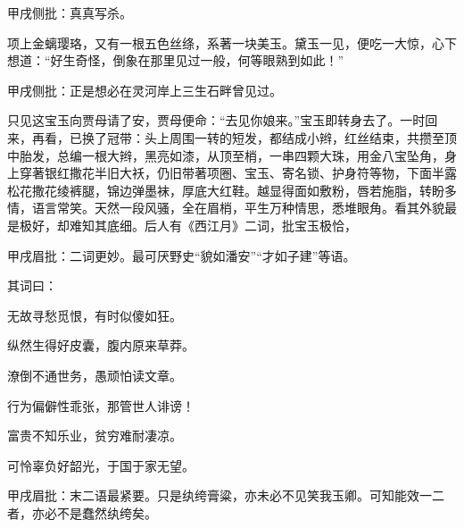 \begin{parag}
    \begin{note}甲戌侧批：真真写杀。\end{note}项上金螭璎珞，又有一根五色丝绦，系著一块美玉。黛玉一见，便吃一大惊，心下想道：“好生奇怪，倒象在那里见过一般，何等眼熟到如此！”\begin{note}甲戌侧批：正是想必在灵河岸上三生石畔曾见过。\end{note}只见这宝玉向贾母请了安，贾母便命：“去见你娘来。”宝玉即转身去了。一时回来，再看，已换了冠带：头上周围一转的短发，都结成小辫，红丝结束，共攒至顶中胎发，总编一根大辫，黑亮如漆，从顶至梢，一串四颗大珠，用金八宝坠角，身上穿著银红撒花半旧大袄，仍旧带著项圈、宝玉、寄名锁、护身符等物，下面半露松花撒花绫裤腿，锦边弹墨袜，厚底大红鞋。越显得面如敷粉，唇若施脂，转盼多情，语言常笑。天然一段风骚，全在眉梢，平生万种情思，悉堆眼角。看其外貌最是极好，却难知其底细。后人有《西江月》二词，批宝玉极恰，\begin{note}甲戌眉批：二词更妙。最可厌野史“貌如潘安”“才如子建”等语。\end{note}其词曰：
\end{parag}
\begin{poem}
    \begin{pl} 无故寻愁觅恨，有时似傻如狂。\end{pl}

    \begin{pl} 纵然生得好皮囊，腹内原来草莽。\end{pl}

    \begin{pl} 潦倒不通世务，愚顽怕读文章。\end{pl}

    \begin{pl} 行为偏僻性乖张，那管世人诽谤！\end{pl}

    \emptypl

    \begin{pl} 富贵不知乐业，贫穷难耐凄凉。\end{pl}

    \begin{pl} 可怜辜负好韶光，于国于家无望。\end{pl}

    \begin{note}甲戌眉批：末二语最紧要。只是纨绔膏粱，亦未必不见笑我玉卿。可知能效一二者，亦必不是蠢然纨绔矣。\end{note}
\end{poem}


